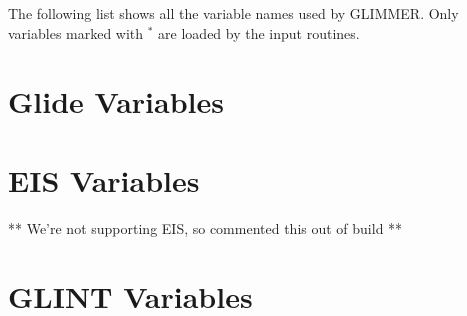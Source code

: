 \label{ug.sec.varlist}
The following list shows all the variable names used by GLIMMER. Only variables marked with $^\ast$ are loaded by the input routines.
\section{Glide Variables}

\section{EIS Variables}
** We're not supporting EIS, so commented this out of build **
%
\section{GLINT Variables}

